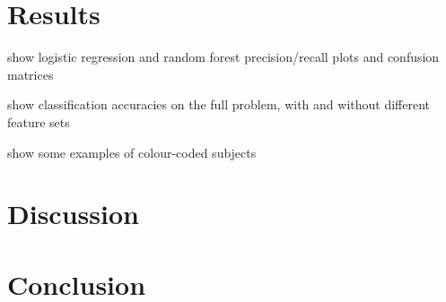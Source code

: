 \documentclass[a4paper]{article}
\begin{document}
  \section{Results}

    show logistic regression and random forest precision/recall plots and confusion matrices

    show classification accuracies on the full problem, with and without different feature sets

    show some examples of colour-coded subjects

  \section{Discussion}

  \section{Conclusion}

  
  
\end{document}
